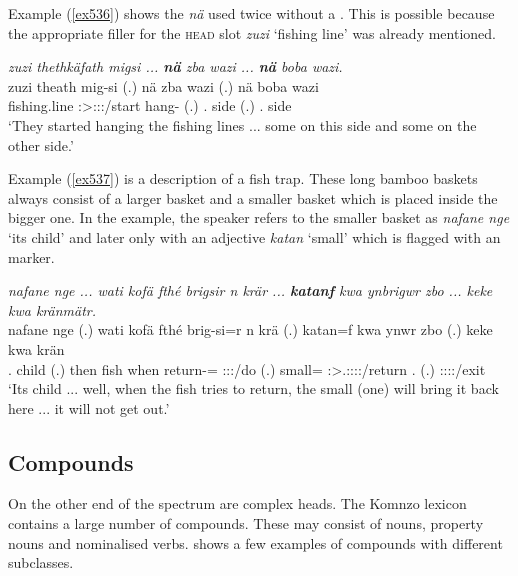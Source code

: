 Example (\ref{ex536}) shows the   \emph{nä} used twice without a . This is possible because the appropriate filler for the \textsc{head} slot \emph{zuzi} `fishing line' was already mentioned.

\begin{exe}
 	\ex \emph{zuzi thethkäfath migsi ... \textbf{nä} zba wazi ... \textbf{nä} boba wazi.}\\
 	\gll zuzi theath mig-si (.) nä zba wazi (.) nä boba wazi\\
	{fishing.line} \Stpl:\Sbj>\Stpl:\Obj:\Pst:\Pfv/start hang-{\Nmlz} (.) {\Indf} \Prox.{\Abl} side (.) {\Indf} \Med.{\Abl} side\\
 	\trans `They started hanging the fishing lines ... some on this side and some on the other side.'
 	\label{ex536}
\end{exe}

Example (\ref{ex537}) is a description of a fish trap. These long bamboo baskets always consist of a larger basket and a smaller basket which is placed inside the bigger one. In the example, the speaker refers to the smaller basket as \emph{nafane nge} `its child' and later only with an adjective \emph{katan} `small' which is flagged with an   marker.

\begin{exe}
 	\ex \emph{nafane nge ... wati kofä fthé brigsir n krär ... \textbf{katanf} kwa ynbrigwr zbo ... keke kwa kränmätr.}\\
 	\gll nafane nge (.) wati kofä fthé brig-si=r n krä (.) katan=f kwa ynwr zbo (.) keke kwa krän\\
 	\Tsg.{\Poss} child (.) then fish when return-\Nmlz={\Purp} {\Imn} \Stsg:\Sbj:\Irr:\Pfv/do (.) small={\Erg} {\Fut} \Stsg:\Sbj>\Tsg.\Masc:\Obj:\Nonpast:\Ipfv:\Venit/return \Prox.{\All} (.) {\Neg} {\Fut} \Stsg:\Sbj:\Irr:\Pfv:\Venit/exit\\
 	\trans `Its child ... well, when the fish tries to return, the small (one) will bring it back here ... it will not get out.'
 	\label{ex537}
\end{exe}

\subsection{Compounds}\label{compounds-subsec}

On the other end of the spectrum are complex heads. The Komnzo lexicon contains a large number of  compounds. These may consist of nouns, property nouns and nominalised verbs.  shows a few examples of compounds with different  subclasses.

